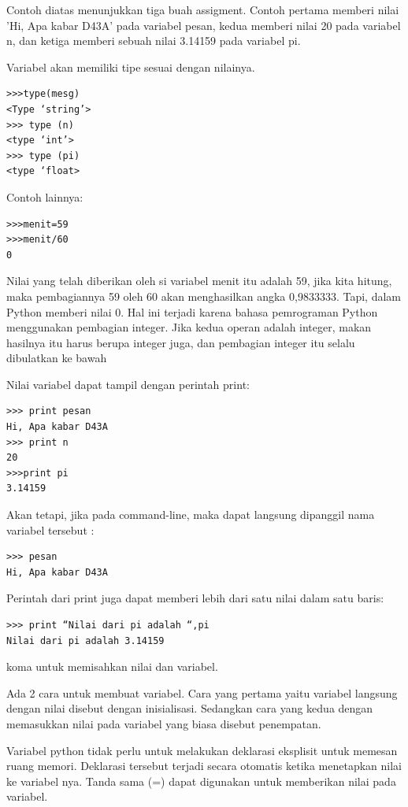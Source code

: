 Contoh diatas menunjukkan tiga buah assigment. Contoh pertama memberi nilai 
'Hi, Apa kabar D43A' pada variabel pesan, 
kedua memberi nilai 20 pada variabel n, dan ketiga memberi sebuah nilai 3.14159 pada variabel pi.
\cite{utami2004logika}

Variabel akan memiliki tipe  sesuai dengan nilainya.
\begin{verbatim}
>>>type(mesg)
<Type ‘string’>
>>> type (n)
<type ‘int’>
>>> type (pi)
<type ‘float>
\end{verbatim}

Contoh lainnya:
\begin{verbatim}
>>>menit=59
>>>menit/60
0
\end{verbatim}
Nilai yang telah diberikan oleh si variabel menit itu adalah 59, jika kita hitung, maka pembagiannya 59 oleh 60 akan menghasilkan angka 0,9833333. Tapi, dalam Python memberi nilai 0. Hal ini terjadi karena bahasa pemrograman Python menggunakan pembagian integer. Jika kedua operan adalah integer, makan hasilnya itu harus berupa integer juga, dan pembagian integer itu selalu dibulatkan ke bawah

Nilai variabel dapat tampil dengan perintah print:
\begin{verbatim}
>>> print pesan
Hi, Apa kabar D43A
>>> print n
20
>>>print pi
3.14159
\end{verbatim}

Akan tetapi, jika pada command-line, maka dapat langsung dipanggil nama variabel tersebut :
\begin{verbatim}
>>> pesan
Hi, Apa kabar D43A
\end{verbatim}

Perintah dari print juga dapat memberi lebih dari satu nilai dalam satu baris:
\begin{verbatim}
>>> print “Nilai dari pi adalah “,pi
Nilai dari pi adalah 3.14159
\end{verbatim}

koma untuk memisahkan nilai dan variabel.\cite{utami2004logika}

Ada 2 cara untuk membuat variabel. Cara yang pertama yaitu variabel langsung dengan nilai disebut dengan inisialisasi. Sedangkan cara yang kedua dengan memasukkan nilai pada variabel yang biasa disebut penempatan.\cite{santoso2009bahasa}

Variabel python tidak perlu untuk melakukan deklarasi eksplisit untuk memesan ruang memori. Deklarasi tersebut terjadi secara otomatis ketika menetapkan nilai ke variabel nya.
Tanda sama (=) dapat digunakan untuk memberikan nilai pada variabel.


